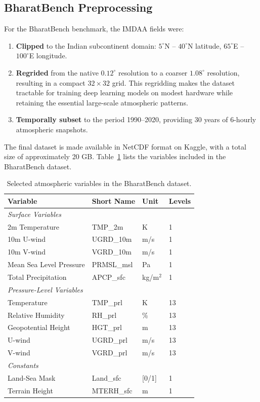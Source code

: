 \documentclass[12pt,a4paper,oneside]{report}
\begin{document}
\subsection{BharatBench Preprocessing}

For the BharatBench benchmark, the IMDAA fields were:
\begin{enumerate}
    \item \textbf{Clipped} to the Indian subcontinent domain: $5^\circ$N -- $40^\circ$N latitude, $65^\circ$E -- $100^\circ$E longitude.
    \item \textbf{Regrided} from the native $0.12^\circ$ resolution to a coarser $1.08^\circ$ resolution, resulting in a compact $32 \times 32$ grid. This regridding makes the dataset tractable for training deep learning models on modest hardware while retaining the essential large-scale atmospheric patterns.
    \item \textbf{Temporally subset} to the period 1990--2020, providing 30 years of 6-hourly atmospheric snapshots.
\end{enumerate}

The final dataset is made available in NetCDF format on Kaggle, with a total size of approximately 20 GB. Table~\ref{tab:variables} lists the variables included in the BharatBench dataset.

\begin{table}[H]
\centering
\caption{Selected atmospheric variables in the BharatBench dataset.}
\label{tab:variables}
\begin{tabular}{p{4.5cm} p{2.5cm} p{2cm} p{2.5cm}}
\toprule
\textbf{Variable} & \textbf{Short Name} & \textbf{Unit} & \textbf{Levels} \\
\midrule
\multicolumn{4}{l}{\textit{Surface Variables}} \\
2m Temperature & TMP\_2m & K & 1 \\
10m U-wind & UGRD\_10m & m/s & 1 \\
10m V-wind & VGRD\_10m & m/s & 1 \\
Mean Sea Level Pressure & PRMSL\_msl & Pa & 1 \\
Total Precipitation & APCP\_sfc & kg/m$^2$ & 1 \\
\midrule
\multicolumn{4}{l}{\textit{Pressure-Level Variables}} \\
Temperature & TMP\_prl & K & 13 \\
Relative Humidity & RH\_prl & \% & 13 \\
Geopotential Height & HGT\_prl & m & 13 \\
U-wind & UGRD\_prl & m/s & 13 \\
V-wind & VGRD\_prl & m/s & 13 \\
\midrule
\multicolumn{4}{l}{\textit{Constants}} \\
Land-Sea Mask & Land\_sfc & [0/1] & 1 \\
Terrain Height & MTERH\_sfc & m & 1 \\
\bottomrule
\end{tabular}
\end{table}
\end{document}
